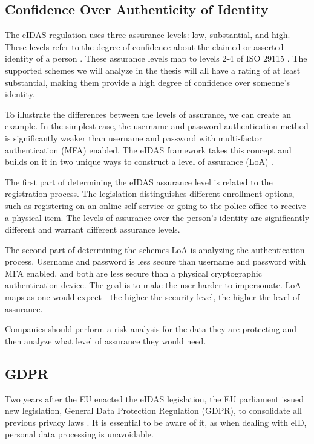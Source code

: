 \subsection{Confidence Over Authenticity of Identity}

The eIDAS regulation uses three assurance levels: low, substantial, and high. These levels refer to the degree of confidence about the claimed or asserted identity of a person \cite{eulaw-eidas}. These assurance levels map to levels 2-4 of ISO 29115 \cite{iso29115}. The supported schemes we will analyze in the thesis will all have a rating of at least substantial, making them provide a high degree of confidence over someone's identity.

To illustrate the differences between the levels of assurance, we can create an example. In the simplest case, the {username and password} authentication method is significantly weaker than {username and password} with multi-factor authentication (MFA) enabled. The eIDAS framework takes this concept and builds on it in two unique ways to construct a level of assurance (LoA) \cite{eulaw-eidas-loa}.

The first part of determining the eIDAS assurance level is related to the registration process. The legislation distinguishes different enrollment options, such as registering on an online self-service or going to the police office to receive a physical item. The levels of assurance over the person's identity are significantly different and warrant different assurance levels.

The second part of determining the schemes LoA is analyzing the authentication process. {Username and password} is less secure than {username and password} with MFA enabled, and both are less secure than a physical cryptographic authentication device. The goal is to make the user harder to impersonate. LoA maps as one would expect - the higher the security level, the higher the level of assurance.

Companies should perform a risk analysis for the data they are protecting and then analyze what level of assurance they would need.

\subsection{GDPR}

Two years after the EU enacted the eIDAS legislation, the EU parliament issued new legislation, General Data Protection Regulation (GDPR), to consolidate all previous privacy laws \cite{eulaw-gdpr}. It is essential to be aware of it, as when dealing with eID, personal data processing is unavoidable.

